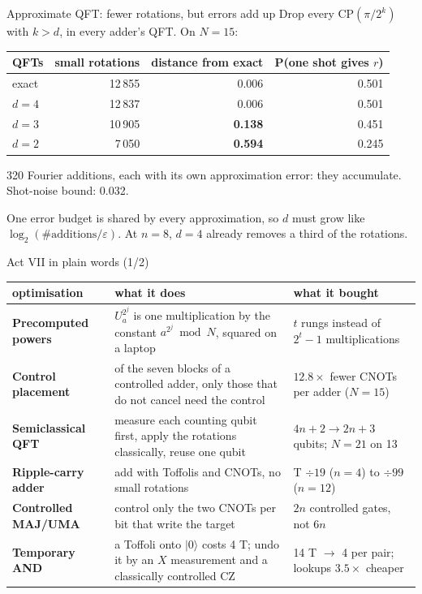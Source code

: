 \documentclass[aspectratio=169,11pt]{beamer}
\begin{document}
\begin{frame}{Approximate QFT: fewer rotations, but errors add up}
  Drop every $\mathrm{CP}(\pi/2^k)$ with $k>d$, in every adder's QFT. On $N=15$:
  \vskip2mm
  \centering
  \renewcommand{\arraystretch}{1.2}
  \begin{tabular}{lrrr}
    \toprule
    QFTs & small rotations & distance from exact & P(one shot gives $r$) \\
    \midrule
    exact & 12\,855 & 0.006 & 0.501 \\
    $d=4$ & 12\,837 & 0.006 & 0.501 \\
    $d=3$ & 10\,905 & \textbf{0.138} & 0.451 \\
    $d=2$ & 7\,050 & \textbf{0.594} & 0.245 \\
    \bottomrule
  \end{tabular}
  \vskip2mm
  \raggedright{\small 320 Fourier additions, each with its own approximation error: they accumulate. Shot-noise bound: 0.032.}
  \begin{takeaway}One error budget is shared by every approximation, so $d$ must grow like $\log_2(\#\text{additions}/\varepsilon)$. At $n=8$, $d=4$ already removes a third of the rotations.\end{takeaway}
\end{frame}

\begin{frame}{Act VII in plain words (1/2)}
  \centering\footnotesize
  \renewcommand{\arraystretch}{1.15}
  \begin{tabular}{@{}>{\raggedright}p{30mm}>{\raggedright}p{63mm}>{\raggedright\arraybackslash\leavevmode\color{cverm}}p{40mm}@{}}
    \toprule
    optimisation & what it does & \color{ink}what it bought \\
    \midrule
    \textbf{Precomputed powers} & $U_a^{2^j}$ is one multiplication by the constant $a^{2^j}\bmod N$, squared on a laptop & $t$ rungs instead of $2^t-1$ multiplications \\
    \textbf{Control placement} & of the seven blocks of a controlled adder, only those that do not cancel need the control & $12.8\times$ fewer CNOTs per adder ($N=15$) \\
    \textbf{Semiclassical QFT} & measure each counting qubit first, apply the rotations classically, reuse one qubit & $4n+2\to2n+3$ qubits; $N=21$ on 13 \\
    \textbf{Ripple-carry adder} & add with Toffolis and CNOTs, no small rotations & T $\div19$ ($n=4$) to $\div99$ ($n=12$) \\
    \textbf{Controlled MAJ/UMA} & control only the two CNOTs per bit that write the target & $2n$ controlled gates, not $6n$ \\
    \textbf{Temporary AND} & a Toffoli onto $|0\rangle$ costs 4 T; undo it by an $X$ measurement and a classically controlled CZ & 14 T $\to$ 4 per pair; lookups $3.5\times$ cheaper \\
    \bottomrule
  \end{tabular}
\end{frame}
\end{document}
